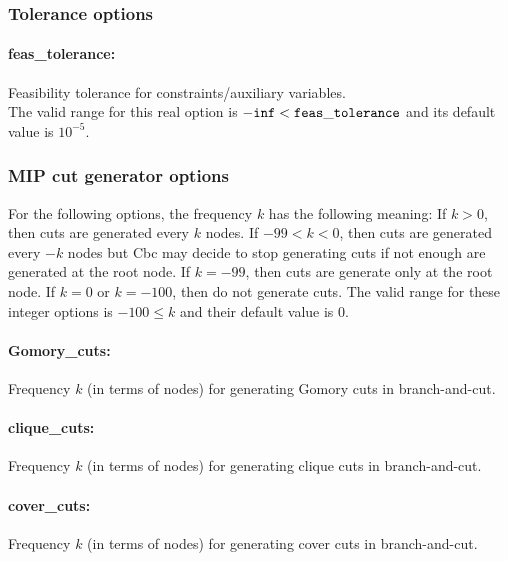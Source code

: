\subsubsection{Tolerance options}

\paragraph{feas\_tolerance:}\label{sec:feas_tolerance} Feasibility tolerance for constraints/auxiliary variables. $\;$ \\
The valid range for this real option is ${\tt -inf} <  {\tt feas\_tolerance }$ and its default value is $10^{-5}$.

\subsubsection{MIP cut generator options}

For the following options, the frequency $k$ has the following meaning:
If $k > 0$, then cuts are generated every $k$ nodes.
If $-99 < k < 0$, then cuts are generated every $-k$ nodes but Cbc may decide to stop generating cuts if not
enough are generated at the root node.
If $k=-99$, then cuts are generate only at the root node.
If $k=0$ or $k=-100$, then do not generate cuts.
The valid range for these integer options is $-100 \le k$ and their default value is $0$.

\paragraph{Gomory\_cuts:}\label{sec:couenne_Gomory_cuts} Frequency $k$ (in terms of nodes) for generating Gomory cuts in branch-and-cut. $\;$

\paragraph{clique\_cuts:}\label{sec:couenne_clique_cuts} Frequency $k$ (in terms of nodes) for generating clique cuts in branch-and-cut. $\;$

\paragraph{cover\_cuts:}\label{sec:couenne_cover_cuts} Frequency $k$ (in terms of nodes) for generating cover cuts in branch-and-cut. $\;$ 

